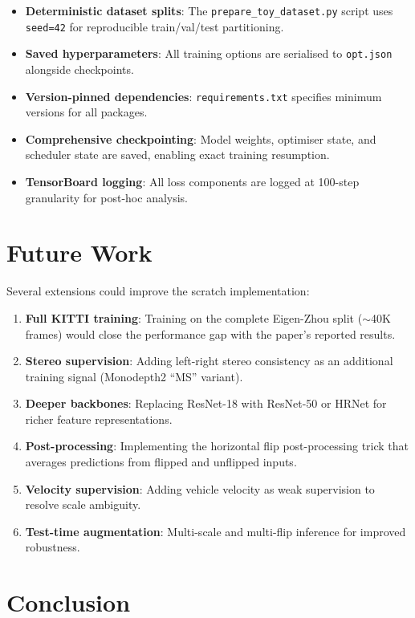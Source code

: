 \documentclass[10pt, a4paper, twocolumn]{article}
\begin{document}
\begin{itemize}[noitemsep]
    \item \textbf{Deterministic dataset splits}: The \texttt{prepare\_toy\_dataset.py} script uses \texttt{seed=42} for reproducible train/val/test partitioning.
    \item \textbf{Saved hyperparameters}: All training options are serialised to \texttt{opt.json} alongside checkpoints.
    \item \textbf{Version-pinned dependencies}: \texttt{requirements.txt} specifies minimum versions for all packages.
    \item \textbf{Comprehensive checkpointing}: Model weights, optimiser state, and scheduler state are saved, enabling exact training resumption.
    \item \textbf{TensorBoard logging}: All loss components are logged at 100-step granularity for post-hoc analysis.
\end{itemize}

\section{Future Work}
\label{sec:future}

Several extensions could improve the scratch implementation:

\begin{enumerate}[noitemsep]
    \item \textbf{Full KITTI training}: Training on the complete Eigen-Zhou split ($\sim$40K frames) would close the performance gap with the paper's reported results.
    \item \textbf{Stereo supervision}: Adding left-right stereo consistency as an additional training signal (Monodepth2 ``MS'' variant).
    \item \textbf{Deeper backbones}: Replacing ResNet-18 with ResNet-50 or HRNet for richer feature representations.
    \item \textbf{Post-processing}: Implementing the horizontal flip post-processing trick that averages predictions from flipped and unflipped inputs.
    \item \textbf{Velocity supervision}: Adding vehicle velocity as weak supervision to resolve scale ambiguity.
    \item \textbf{Test-time augmentation}: Multi-scale and multi-flip inference for improved robustness.
\end{enumerate}

\section{Conclusion}
\label{sec:conclusion}
\end{document}
